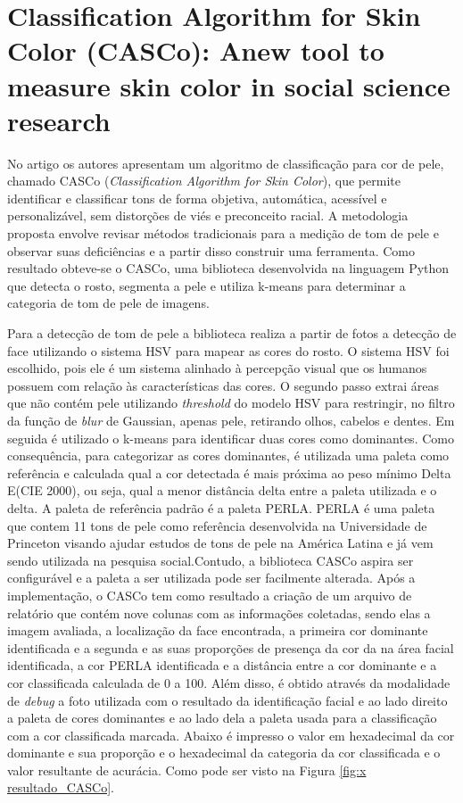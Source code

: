 \section{Classification Algorithm for Skin Color (CASCo): Anew tool to measure skin color in social science research}
No artigo \cite{Classification_Algorithm_for_Skin_Color_CASCo_A_new_tool} os autores apresentam um algoritmo de classificação para cor de pele, chamado CASCo (\textit{Classification Algorithm for Skin Color}),  que permite identificar e classificar tons de forma objetiva, automática, acessível e personalizável, sem distorções de viés e preconceito racial. A metodologia proposta envolve revisar métodos tradicionais para a medição de tom de pele e observar suas deficiências e a partir disso construir uma ferramenta. Como resultado obteve-se o CASCo, uma biblioteca desenvolvida na linguagem Python que detecta o rosto, segmenta a pele e utiliza k-means para determinar a categoria de tom de pele de imagens.  

Para a detecção de tom de pele a biblioteca realiza a partir de fotos a detecção de face utilizando o sistema HSV para mapear as cores do rosto. O sistema HSV foi escolhido, pois ele é um sistema alinhado à percepção visual que os humanos possuem com relação às características das cores. 
O segundo passo extrai áreas que não contém pele utilizando \textit{threshold} do modelo HSV para restringir, no filtro da função de\textit{ blur} de Gaussian, apenas pele, retirando olhos, cabelos e dentes. Em seguida é utilizado o k-means para identificar duas cores como dominantes.
Como consequência, para categorizar as cores dominantes, é utilizada uma paleta como referência e calculada qual a cor detectada é mais próxima ao peso mínimo Delta E(CIE 2000), ou seja, qual a menor distância delta entre a paleta utilizada e o delta.
A paleta de referência padrão é a paleta PERLA. PERLA é uma paleta que contem 11 tons de pele como referência desenvolvida na Universidade de Princeton visando ajudar estudos de tons de pele na América Latina e já vem sendo utilizada na pesquisa social.Contudo, a biblioteca CASCo aspira ser configurável e a paleta a ser utilizada pode ser facilmente alterada.
Após a implementação, o CASCo tem como resultado a criação de um arquivo de relatório que contém nove colunas com as informações coletadas, sendo elas a imagem avaliada, a localização da face encontrada, a primeira cor dominante identificada e a segunda e as suas proporções de presença da cor da na área facial identificada, a cor PERLA identificada e a distância entre a cor dominante e a cor classificada calculada de 0 a 100. Além disso, é obtido através da modalidade de \textit{debug} a foto utilizada com o resultado da identificação facial e ao lado direito a paleta de cores dominantes e ao lado dela a paleta usada para a classificação com a cor classificada marcada. Abaixo é impresso o valor em hexadecimal da cor dominante e sua proporção e o hexadecimal da categoria da cor classificada e o valor resultante de acurácia. Como pode ser visto na Figura \ref{fig:x resultado_CASCo}.



